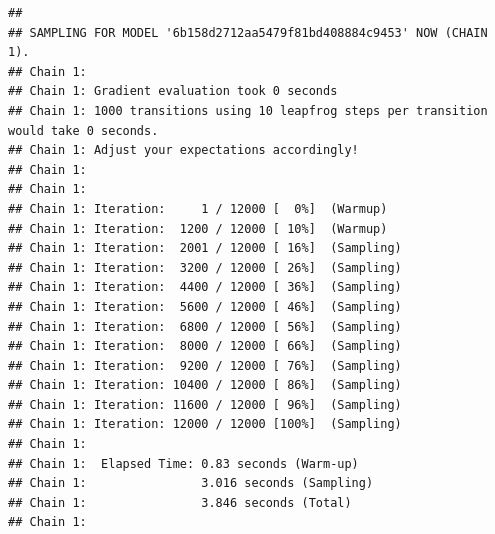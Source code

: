 \documentclass[
]{book}
\begin{document}
\begin{verbatim}
## 
## SAMPLING FOR MODEL '6b158d2712aa5479f81bd408884c9453' NOW (CHAIN 1).
## Chain 1: 
## Chain 1: Gradient evaluation took 0 seconds
## Chain 1: 1000 transitions using 10 leapfrog steps per transition would take 0 seconds.
## Chain 1: Adjust your expectations accordingly!
## Chain 1: 
## Chain 1: 
## Chain 1: Iteration:     1 / 12000 [  0%]  (Warmup)
## Chain 1: Iteration:  1200 / 12000 [ 10%]  (Warmup)
## Chain 1: Iteration:  2001 / 12000 [ 16%]  (Sampling)
## Chain 1: Iteration:  3200 / 12000 [ 26%]  (Sampling)
## Chain 1: Iteration:  4400 / 12000 [ 36%]  (Sampling)
## Chain 1: Iteration:  5600 / 12000 [ 46%]  (Sampling)
## Chain 1: Iteration:  6800 / 12000 [ 56%]  (Sampling)
## Chain 1: Iteration:  8000 / 12000 [ 66%]  (Sampling)
## Chain 1: Iteration:  9200 / 12000 [ 76%]  (Sampling)
## Chain 1: Iteration: 10400 / 12000 [ 86%]  (Sampling)
## Chain 1: Iteration: 11600 / 12000 [ 96%]  (Sampling)
## Chain 1: Iteration: 12000 / 12000 [100%]  (Sampling)
## Chain 1: 
## Chain 1:  Elapsed Time: 0.83 seconds (Warm-up)
## Chain 1:                3.016 seconds (Sampling)
## Chain 1:                3.846 seconds (Total)
## Chain 1:
\end{verbatim}
\end{document}

